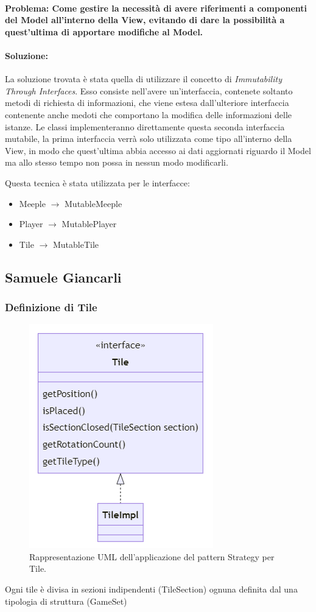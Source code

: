 \paragraph{Problema: Come gestire la necessità di avere riferimenti a componenti del Model all'interno della View, evitando di dare la possibilità a quest'ultima di apportare modifiche al Model.}
\paragraph{Soluzione:}
La soluzione trovata è stata quella di utilizzare il concetto di \textit{Immutability Through Interfaces}. Esso consiste nell'avere un'interfaccia, contenete soltanto metodi di richiesta di informazioni, che viene estesa dall'ulteriore interfaccia contenente anche medoti che comportano la modifica delle informazioni delle istanze. Le classi implementeranno direttamente questa seconda interfaccia mutabile, la prima interfaccia verrà solo utilizzata come tipo all'interno della View, in modo che quest'ultima abbia accesso ai dati aggiornati riguardo il Model ma allo stesso tempo non possa in nessun modo modificarli.

Questa tecnica è stata utilizzata per le interfacce:
\begin{itemize}
    \item Meeple $\rightarrow$ MutableMeeple
    \item Player $\rightarrow$ MutablePlayer
    \item Tile $\rightarrow$ MutableTile
\end{itemize}

\subsection*{Samuele Giancarli}
\subsubsection*{Definizione di Tile}
\begin{figure}[ht]
    \centering\includegraphics[]{images/tile_uml.png}
    \caption{Rappresentazione UML dell'applicazione del pattern Strategy per Tile.}
\end{figure}
Ogni tile è divisa in sezioni indipendenti (TileSection) ognuna definita dal una tipologia di struttura (GameSet)
